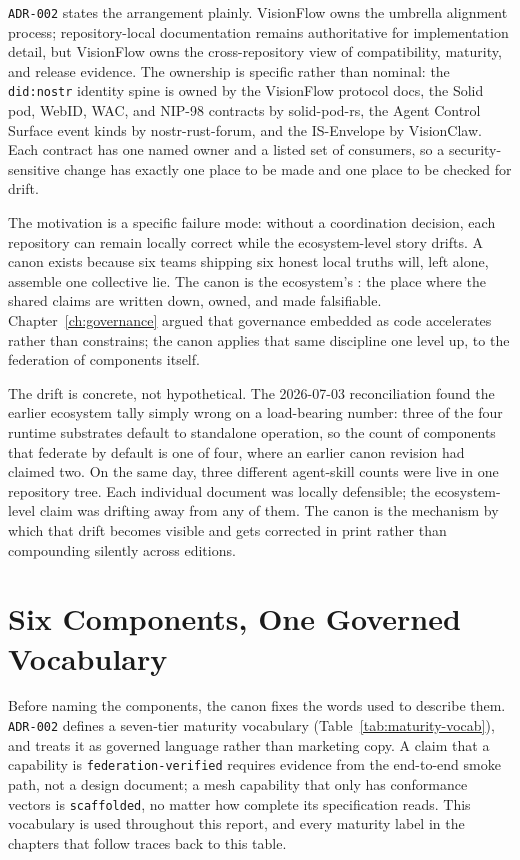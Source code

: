 \texttt{ADR-002} states the arrangement plainly. VisionFlow owns the umbrella alignment process; repository-local documentation remains authoritative for implementation detail, but VisionFlow owns the cross-repository view of compatibility, maturity, and release evidence. The ownership is specific rather than nominal: the \texttt{did:nostr} identity spine is owned by the VisionFlow protocol docs, the Solid pod, WebID, WAC, and NIP-98 contracts by solid-pod-rs, the Agent Control Surface event kinds by nostr-rust-forum, and the IS-Envelope by VisionClaw. Each contract has one named owner and a listed set of consumers, so a security-sensitive change has exactly one place to be made and one place to be checked for drift.

The motivation is a specific failure mode: without a coordination decision, each repository can remain locally correct while the ecosystem-level story drifts. A canon exists because six teams shipping six honest local truths will, left alone, assemble one collective lie. The canon is the ecosystem's : the place where the shared claims are written down, owned, and made falsifiable. Chapter~\ref{ch:governance} argued that governance embedded as code accelerates rather than constrains; the canon applies that same discipline one level up, to the federation of components itself.

The drift is concrete, not hypothetical. The 2026-07-03 reconciliation found the earlier ecosystem tally simply wrong on a load-bearing number: three of the four runtime substrates default to standalone operation, so the count of components that federate by default is one of four, where an earlier canon revision had claimed two. On the same day, three different agent-skill counts were live in one repository tree. Each individual document was locally defensible; the ecosystem-level claim was drifting away from any of them. The canon is the mechanism by which that drift becomes visible and gets corrected in print rather than compounding silently across editions.

\section{Six Components, One Governed Vocabulary}

Before naming the components, the canon fixes the words used to describe them. \texttt{ADR-002} defines a seven-tier maturity vocabulary (Table~\ref{tab:maturity-vocab}), and treats it as governed language rather than marketing copy. A claim that a capability is \texttt{federation-verified} requires evidence from the end-to-end smoke path, not a design document; a mesh capability that only has conformance vectors is \texttt{scaffolded}, no matter how complete its specification reads. This vocabulary is used throughout this report, and every maturity label in the chapters that follow traces back to this table.

